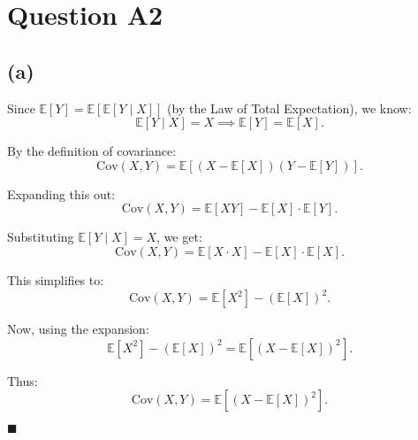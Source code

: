 \documentclass{article}
\begin{document}
\section*{Question A2}
\subsection*{(a)}

\quad Since $\mathbb{E}[Y] = \mathbb{E}[\mathbb{E}[Y \mid X]]$ (by the Law of Total Expectation), we know:
\[
    \mathbb{E}[Y \mid X] = X \implies \mathbb{E}[Y] = \mathbb{E}[X].
\]

By the definition of covariance:
\[
    \text{Cov}(X, Y) = \mathbb{E}[(X - \mathbb{E}[X])(Y - \mathbb{E}[Y])].
\]

Expanding this out:
\[
    \text{Cov}(X, Y) = \mathbb{E}[XY] - \mathbb{E}[X] \cdot \mathbb{E}[Y].
\]

Substituting $\mathbb{E}[Y \mid X] = X$, we get:
\[
    \text{Cov}(X, Y) = \mathbb{E}[X \cdot X] - \mathbb{E}[X] \cdot \mathbb{E}[X].
\]

This simplifies to:
\[
    \text{Cov}(X, Y) = \mathbb{E}[X^2] - (\mathbb{E}[X])^2.
\]

Now, using the expansion:
\[
    \mathbb{E}[X^2] - (\mathbb{E}[X])^2 = \mathbb{E}[(X - \mathbb{E}[X])^2].
\]

Thus:
\[
    \text{Cov}(X, Y) = \mathbb{E}[(X - \mathbb{E}[X])^2].
\]

\hfill\(\blacksquare\)
\end{document}
